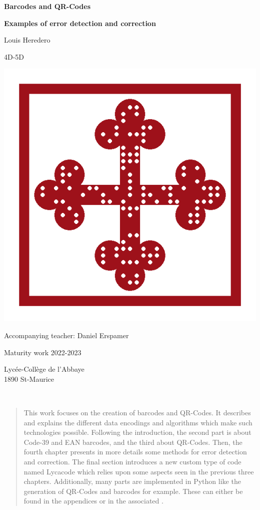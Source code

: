 \begin{titlepage}
  \begin{center}
    \Huge \textbf{Barcodes and QR-Codes}

    \large \textbf{Examples of error detection and correction}

    \vspace{1cm}

    \LARGE Louis Heredero

    \large 4D-5D

    \includegraphics[width=0.7\linewidth]{images/lycacode_ex_final}

    \Large Accompanying teacher: Daniel Erspamer

    \vspace{2cm}

    \LARGE Maturity work 2022-2023
    \vspace{1cm}

    \Large Lycée-Collège de l'Abbaye \\ 1890 St-Maurice

  \end{center}
\end{titlepage}

\clearpage
~
\thispagestyle{empty}
\clearpage

\begin{abstract}
  This work focuses on the creation of barcodes and QR-Codes. It describes and explains the different data encodings and algorithms which make such technologies possible. Following the introduction, the second part is about Code-39 and EAN barcodes, and the third about QR-Codes. Then, the fourth chapter presents in more details some methods for error detection and correction. The final section introduces a new custom type of code named Lycacode which relies upon some aspects seen in the previous three chapters. Additionally, many parts are implemented in Python like the generation of QR-Codes and barcodes for example. These can either be found in the appendices or in the associated .
\end{abstract}

\tableofcontents
\listoffigures
\listoftables
